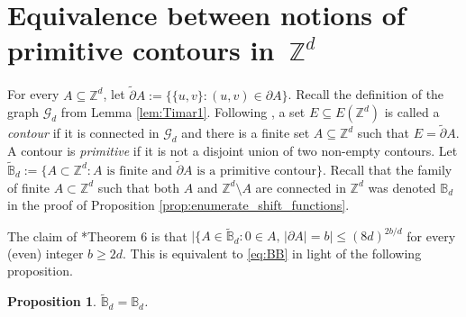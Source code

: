 \documentclass[11pt, reqno]{amsart}
\newtheorem{proposition}[theorem]{Proposition}
\newcommand{\Z}{\mathbb{Z}}
\numberwithin{equation}{section}
\begin{document}
\appendix

\section{Equivalence between notions of primitive contours in~$\Z^d$}
\label{app:BB}

For every $A\subseteq{\mathbb Z}^d$, 
let $\tilde{\partial}A:=\{\{u,v\}\colon (u,v)\in\partial A\}$.
Recall the definition of the graph ${\mathcal G}_d$ from Lemma \ref{lem:Timar1}.
Following \cites{LM,BB}, 
a set $E\subseteq E({\mathbb Z}^d)$ is called a \emph{contour} if it is connected in ${\mathcal G}_d$ and there is a finite set $A\subseteq{\mathbb Z}^d$ such that $E=\tilde{\partial}A$.
A contour is \emph{primitive} if it is not a disjoint union of two non-empty contours.
Let $\tilde{\mathbb B}_d:=\{A\subset{\mathbb Z}^d\colon A \text{ is finite and } \tilde{\partial}A \text{ is a primitive contour}\}$.
Recall that the family of finite $A\subset{\mathbb Z}^d$ such that both $A$ and ${\mathbb Z}^d\setminus A$ are connected in ${\mathbb Z}^d$ was denoted ${\mathbb B}_d$ in the proof of Proposition \ref{prop:enumerate_shift_functions}. 

The claim of \cite{BB}*{Theorem 6} is that $\lvert\{A\in \tilde{\mathbb B}_d\colon 0\in A,\,\lvert\partial A\rvert=b\rvert\leq (8d)^{2b/d}$ for every (even) integer $b\geq 2d$.
This is equivalent to \eqref{eq:BB} in light of the following proposition.

\begin{proposition}
$\tilde{\mathbb B}_d={\mathbb B}_d$.
\end{proposition}
\end{document}
